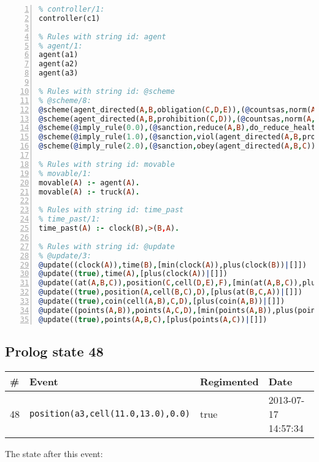 \documentclass[11pt]{article}\usepackage[utf8]{inputenc}\usepackage{geometry}
\begin{document}
\begin{lstlisting}[language=Prolog, numbers=left]
% Rules with string id: controller
% controller/1:
controller(c1)

% Rules with string id: agent
% agent/1:
agent(a1)
agent(a2)
agent(a3)

% Rules with string id: @scheme
% @scheme/8:
@scheme(agent_directed(A,B,obligation(C,D,E)),(@countsas,norm(A,B,F,obligation(C,D,E)),F),false,(listTrue(C)),(time_past(D)),false,[plus(viol(agent_directed(A,B,obligation(C,D,E))))|[]],[plus(obey(agent_directed(A,B,obligation(C,D,E))))|[]])
@scheme(agent_directed(A,B,prohibition(C,D)),(@countsas,norm(A,B,E,prohibition(C,D)),E),(listTrue(C)),false,(false),false,[plus(viol(agent_directed(A,B,prohibition(C,D))))|[]],[plus(obey(agent_directed(A,B,prohibition(C,D))))|[]])
@scheme(@imply_rule(0.0),(@sanction,reduce(A,B),do_reduce_health(A,B),notifyAgent(A,changed(status))),true,false,false,false,[min(reduce(A,B))|[]],[])
@scheme(@imply_rule(1.0),(@sanction,viol(agent_directed(A,B,prohibition(C,D))),do_sanction(D)),true,false,false,false,[min(viol(agent_directed(A,B,prohibition(C,D))))|[]],[])
@scheme(@imply_rule(2.0),(@sanction,obey(agent_directed(A,B,C))),true,false,false,false,[min(obey(agent_directed(A,B,C)))|[]],[])

% Rules with string id: movable
% movable/1:
movable(A) :- agent(A).
movable(A) :- truck(A).

% Rules with string id: time_past
% time_past/1:
time_past(A) :- clock(B),>(B,A).

% Rules with string id: @update
% @update/3:
@update((clock(A)),time(B),[min(clock(A)),plus(clock(B))|[]])
@update((true),time(A),[plus(clock(A))|[]])
@update((at(A,B,C)),position(C,cell(D,E),F),[min(at(A,B,C)),plus(at(D,E,C))|[]])
@update((true),position(A,cell(B,C),D),[plus(at(B,C,A))|[]])
@update((true),coin(cell(A,B),C,D),[plus(coin(A,B))|[]])
@update((points(A,B)),points(A,C,D),[min(points(A,B)),plus(points(A,D))|[]])
@update((true),points(A,B,C),[plus(points(A,C))|[]])

\end{lstlisting}
\clearpage 
\subsection{Prolog state 48}
\begin{table}[ht]
\centering 
\begin{tabular}{l l l l} 
\textbf{\#} & \textbf{Event} & \textbf{Regimented} & \textbf{Date} \\ [0.5ex] 
\hline
48&\texttt{position(a3,cell(11.0,13.0),0.0)}&true&2013-07-17 14:57:34\\ [1ex] \hline\end{tabular}
\end{table}
The state after this event:
\end{document}
